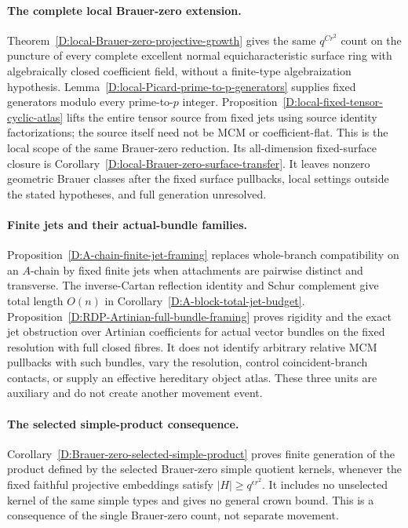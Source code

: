 \paragraph{The complete local Brauer-zero extension.}
Theorem~\ref{D:local-Brauer-zero-projective-growth} gives the same
$q^{Cr^2}$ count on the puncture of every complete excellent normal
equicharacteristic surface ring with algebraically closed coefficient
field, without a finite-type algebraization hypothesis.
Lemma~\ref{D:local-Picard-prime-to-p-generators} supplies fixed
generators modulo every prime-to-$p$ integer.
Proposition~\ref{D:local-fixed-tensor-cyclic-atlas} lifts the entire
tensor source from fixed jets using source identity factorizations;
the source itself need not be MCM or coefficient-flat. This is the
local scope of the same Brauer-zero reduction. Its all-dimension fixed-surface closure is
Corollary~\ref{D:local-Brauer-zero-surface-transfer}. It leaves
nonzero geometric Brauer classes after the fixed surface pullbacks,
local settings outside the stated hypotheses, and full generation unresolved.

\paragraph{Finite jets and their actual-bundle families.}
Proposition~\ref{D:A-chain-finite-jet-framing} replaces whole-branch
compatibility on an $A$-chain by fixed finite jets when attachments
are pairwise distinct and transverse. The inverse-Cartan reflection
identity and Schur complement give total length $O(n)$ in
Corollary~\ref{D:A-block-total-jet-budget}.
Proposition~\ref{D:RDP-Artinian-full-bundle-framing} proves rigidity
and the exact jet obstruction over Artinian coefficients for actual
vector bundles on the fixed resolution with full closed fibres.
It does not identify arbitrary relative MCM pullbacks with such
bundles, vary the resolution, control coincident-branch contacts,
or supply an effective hereditary object atlas. These three units
are auxiliary and do not create another movement event.

\paragraph{The selected simple-product consequence.}
Corollary~\ref{D:Brauer-zero-selected-simple-product} proves finite
generation of the product defined by the selected Brauer-zero simple
quotient kernels, whenever the fixed faithful projective embeddings
satisfy $|H|\ge q^{\epsilon r^2}$. It includes no unselected kernel
of the same simple types and gives no general crown bound. This is
a consequence of the single Brauer-zero count, not separate movement.


